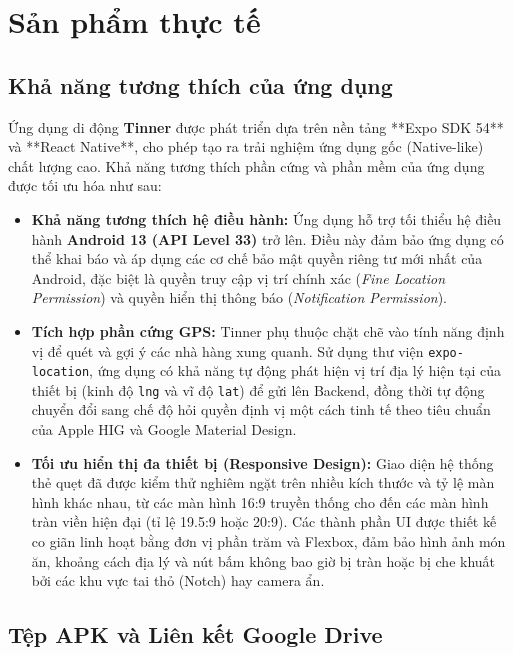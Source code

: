 \section{Sản phẩm thực tế}
\label{sec:runnable_product}

\subsection{Khả năng tương thích của ứng dụng}
\label{subsec:app_compatibility}

Ứng dụng di động \textbf{Tinner} được phát triển dựa trên nền tảng **Expo SDK 54** và **React Native**, cho phép tạo ra trải nghiệm ứng dụng gốc (Native-like) chất lượng cao. Khả năng tương thích phần cứng và phần mềm của ứng dụng được tối ưu hóa như sau:

\begin{itemize}
    \item \textbf{Khả năng tương thích hệ điều hành:} Ứng dụng hỗ trợ tối thiểu hệ điều hành \textbf{Android 13 (API Level 33)} trở lên. Điều này đảm bảo ứng dụng có thể khai báo và áp dụng các cơ chế bảo mật quyền riêng tư mới nhất của Android, đặc biệt là quyền truy cập vị trí chính xác (\textit{Fine Location Permission}) và quyền hiển thị thông báo (\textit{Notification Permission}).
    \item \textbf{Tích hợp phần cứng GPS:} Tinner phụ thuộc chặt chẽ vào tính năng định vị để quét và gợi ý các nhà hàng xung quanh. Sử dụng thư viện \texttt{expo-location}, ứng dụng có khả năng tự động phát hiện vị trí địa lý hiện tại của thiết bị (kinh độ \texttt{lng} và vĩ độ \texttt{lat}) để gửi lên Backend, đồng thời tự động chuyển đổi sang chế độ hỏi quyền định vị một cách tinh tế theo tiêu chuẩn của Apple HIG và Google Material Design.
    \item \textbf{Tối ưu hiển thị đa thiết bị (Responsive Design):} Giao diện hệ thống thẻ quẹt đã được kiểm thử nghiêm ngặt trên nhiều kích thước và tỷ lệ màn hình khác nhau, từ các màn hình 16:9 truyền thống cho đến các màn hình tràn viền hiện đại (tỉ lệ 19.5:9 hoặc 20:9). Các thành phần UI được thiết kế co giãn linh hoạt bằng đơn vị phần trăm và Flexbox, đảm bảo hình ảnh món ăn, khoảng cách địa lý và nút bấm không bao giờ bị tràn hoặc bị che khuất bởi các khu vực tai thỏ (Notch) hay camera ẩn.
\end{itemize}

\subsection{Tệp APK và Liên kết Google Drive}
\label{subsec:apk_distribution}


